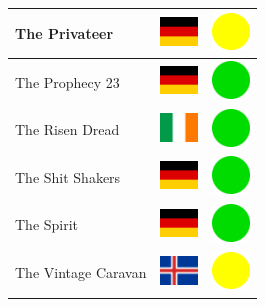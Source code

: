 \documentclass[12pt, a4paper, twoside]{report}
\begin{document}
\begin{center}
\begin{longtable}{|p{5cm}|p{2cm}|p{2cm}|}
 The Privateer                                              & \includegraphics[width=1cm]{4x3/de} &   \includegraphics[width=1cm]{likes/m} \\ \hline
 The Prophecy 23                                            & \includegraphics[width=1cm]{4x3/de} &   \includegraphics[width=1cm]{likes/y} \\ \hline
 The Risen Dread                                            & \includegraphics[width=1cm]{4x3/ie} &   \includegraphics[width=1cm]{likes/y} \\ \hline
 The Shit Shakers                                           & \includegraphics[width=1cm]{4x3/de} &   \includegraphics[width=1cm]{likes/y} \\ \hline
 The Spirit                                                 & \includegraphics[width=1cm]{4x3/de} &   \includegraphics[width=1cm]{likes/y} \\ \hline
 The Vintage Caravan                                        & \includegraphics[width=1cm]{4x3/is} &   \includegraphics[width=1cm]{likes/m} \\ \hline

\end{longtable}
\end{center}
\end{document}

